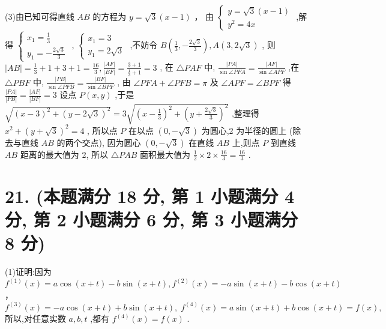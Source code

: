 \documentclass[10pt]{article}
\begin{document}
(3)由已知可得直线 \({AB}\) 的方程为 \(y = \sqrt{3}\left( {x - 1}\right)\) ， 由 \(\left\{  \begin{array}{l} y = \sqrt{3}\left( {x - 1}\right) \\  {y}^{2} = {4x} \end{array}\right.\) ,解得 \(\left\{  \begin{array}{l} {x}_{1} = \frac{1}{3} \\  {y}_{1} =  - \frac{2\sqrt{3}}{3} \end{array}\right.\) , \(\left\{  \begin{array}{l} {x}_{1} = 3 \\  {y}_{1} = 2\sqrt{3} \end{array}\right.\) ,不妨令 \(B\left( {\frac{1}{3}, - \frac{2\sqrt{3}}{3}}\right) ,A\left( {3,2\sqrt{3}}\right)\) , 则 \(\left| {AB}\right|  = \frac{1}{3} + 1 + 3 + 1 = \frac{16}{3},\frac{\left| AF\right| }{\left| BF\right| } = \frac{3 + 1}{\frac{1}{3} + 1} = 3\) , 在 \(\bigtriangleup {PAF}\) 中, \(\frac{\left| PA\right| }{\sin \angle {PFA}} = \frac{\left| AF\right| }{\sin \angle {APF}}\) ,在 \(\bigtriangleup {PBF}\) 中, \(\frac{\left| PB\right| }{\sin \angle {PFB}} = \frac{\left| BF\right| }{\sin \angle {BPF}}\) , 由 \(\angle {PFA} + \angle {PFB} = \pi\) 及 \(\angle {APF} = \angle {BPF}\) 得 \(\frac{\left| PA\right| }{\left| PB\right| } = \frac{\left| AF\right| }{\left| BF\right| } = 3\) 设点 \(P\left( {x,y}\right)\) ,于是 \(\sqrt{{\left( x - 3\right) }^{2} + {\left( y - 2\sqrt{3}\right) }^{2}} = 3\sqrt{{\left( x - \frac{1}{3}\right) }^{2} + {\left( y + \frac{2\sqrt{3}}{3}\right) }^{2}}\) ,整理得 \({x}^{2} + {\left( y + \sqrt{3}\right) }^{2} = 4\) , 所以点 \(P\) 在以点 \(\left( {0, - \sqrt{3}}\right)\) 为圆心,2 为半径的圆上 (除去与直线 \({AB}\) 的两个交点), 因为圆心 \(\left( {0, - \sqrt{3}}\right)\) 在直线 \({AB}\) 上,则点 \(P\) 到直线 \({AB}\) 距离的最大值为 2, 所以 \(\bigtriangleup {PAB}\) 面积最大值为 \(\frac{1}{2} \times  2 \times  \frac{16}{3} = \frac{16}{3}\) .

\section*{21. (本题满分 18 分, 第 1 小题满分 4 分, 第 2 小题满分 6 分, 第 3 小题满分 8 分)}

(1)证明:因为 \({f}^{\left( 1\right) }\left( x\right)  = a\cos \left( {x + t}\right)  - b\sin \left( {x + t}\right) ,{f}^{\left( 2\right) }\left( x\right)  =  - a\sin \left( {x + t}\right)  - b\cos \left( {x + t}\right)\) ， \({f}^{\left( 3\right) }\left( x\right)  =  - a\cos \left( {x + t}\right)  + b\sin \left( {x + t}\right) ,\;{f}^{\left( 4\right) }\left( x\right)  = a\sin \left( {x + t}\right)  + b\cos \left( {x + t}\right)  = f\left( x\right) ,\) 所以,对任意实数 \(a,b,t\) ,都有 \({f}^{\left( 4\right) }\left( x\right)  = f\left( x\right)\) .
\end{document}
